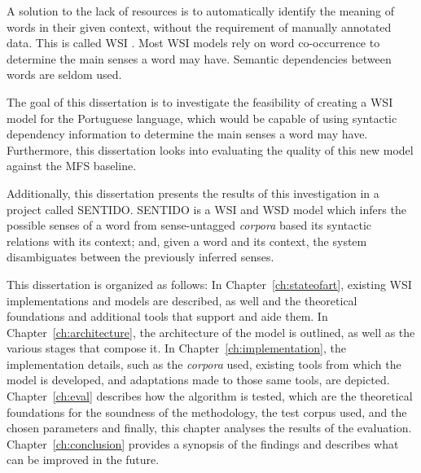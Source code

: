A solution to the lack of resources is to automatically identify the meaning of
words in their given context, without the requirement of manually annotated
data. This is called \ac{WSI} \citep{agirre2007semeval}. Most \ac{WSI} models 
rely on word co-occurrence to determine the main senses a word may have. 
Semantic dependencies between words are seldom used.



The goal of this dissertation is to investigate the feasibility of creating a
\ac{WSI} model for the Portuguese language, which would be capable of using 
syntactic dependency information to determine the main senses a word may have. 
Furthermore, this dissertation looks into evaluating the quality 
of this new model against the \ac{MFS} baseline.


Additionally, this dissertation presents the results of this investigation in
a project called \ac{SENTIDO}. \ac{SENTIDO} is a \ac{WSI} and \ac{WSD} model
which infers the possible senses of a word from sense-untagged \emph{corpora} based its syntactic relations with its context; and, given a word and its context, the system disambiguates between the previously inferred senses.


This dissertation is organized as follows: In Chapter~\ref{ch:stateofart}, existing \ac{WSI} implementations and models are described, as well and the theoretical foundations and additional tools that support and aide them. In Chapter~\ref{ch:architecture}, the architecture of the model is outlined, as well as the various stages that compose it. In Chapter~\ref{ch:implementation}, the implementation details, such as the \emph{corpora} used, existing tools from which the model is developed, and adaptations made to those same tools, are depicted. Chapter~\ref{ch:eval} describes how the algorithm is tested, which are the theoretical foundations for the soundness of the methodology, the test corpus used, and the chosen parameters and finally, this chapter analyses the results of the evaluation. Chapter~\ref{ch:conclusion} provides a synopsis of the findings and describes what can be improved in the future.

